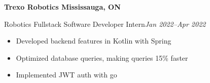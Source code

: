 \textbf{Trexo Robotics \hfill Mississauga, ON}

Robotics Fullstack Software Developer Intern\hfill \textit{Jan 2022--Apr 2022}
\begin{itemize}
    \item Developed backend features in Kotlin with Spring
    \item Optimized database queries, making queries 15\% faster
    \item Implemented JWT auth with go
\end{itemize}
